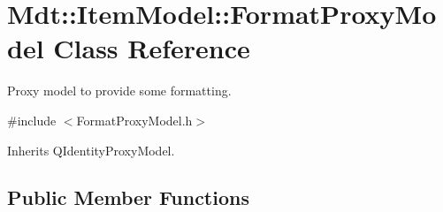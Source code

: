 \hypertarget{class_mdt_1_1_item_model_1_1_format_proxy_model}{}\section{Mdt\+:\+:Item\+Model\+:\+:Format\+Proxy\+Model Class Reference}
\label{class_mdt_1_1_item_model_1_1_format_proxy_model}


Proxy model to provide some formatting.  




{\ttfamily \#include $<$Format\+Proxy\+Model.\+h$>$}



Inherits Q\+Identity\+Proxy\+Model.

\subsection*{Public Member Functions}
